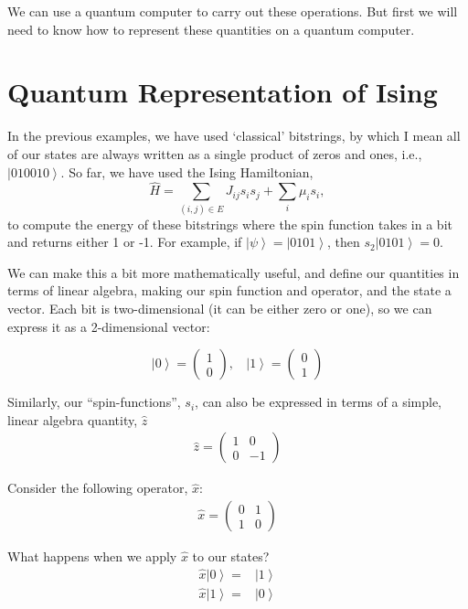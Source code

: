 \documentclass[11pt]{article}
\providecommand{\ket}[1]{\left|#1\right\rangle}
\begin{document}
    We can use a quantum computer to carry out these operations. But first
we will need to know how to represent these quantities on a quantum
computer.

\section{Quantum Representation of
Ising}\label{quantum-representation-of-ising}

In the previous examples, we have used `classical' bitstrings, by which
I mean all of our states are always written as a single product of zeros
and ones, i.e., \(\ket{010010}\). So far, we have used the Ising
Hamiltonian,
\[ \hat{H} = \sum_{(i,j)\in E}J_{ij} s_is_j + \sum_i \mu_i s_i,\] to
compute the energy of these bitstrings where the spin function takes in
a bit and returns either 1 or -1. For example, if
\(\ket{\psi}=\ket{0101}\), then \(s_2\ket{0101}=0\).

We can make this a bit more mathematically useful, and define our
quantities in terms of linear algebra, making our spin function and
operator, and the state a vector. Each bit is two-dimensional (it can be
either zero or one), so we can express it as a 2-dimensional vector:

\[
\ket{0} = \begin{pmatrix}1 \\ 0\end{pmatrix},
\text{ }~ 
\ket{1} = \begin{pmatrix}0 \\ 1\end{pmatrix} 
\]

Similarly, our ``spin-functions'', \(s_i\), can also be expressed in
terms of a simple, linear algebra quantity, \(\hat{z}\)\\
\[\begin{align}
\hat{z} = \begin{pmatrix}1 & 0 \\ 0 &-1\end{pmatrix}
\end{align}
\]

Consider the following operator, \(\hat{x}\): \[\begin{align}
\hat{x} = \begin{pmatrix}0 & 1 \\ 1 &0\end{pmatrix}
\end{align}
\]

What happens when we apply \(\hat{x}\) to our states? \[
\begin{align}
\hat{x}\ket{0} =& \ket{1} \\ 
\hat{x}\ket{1} =& \ket{0} 
\end{align}
\]
\end{document}
